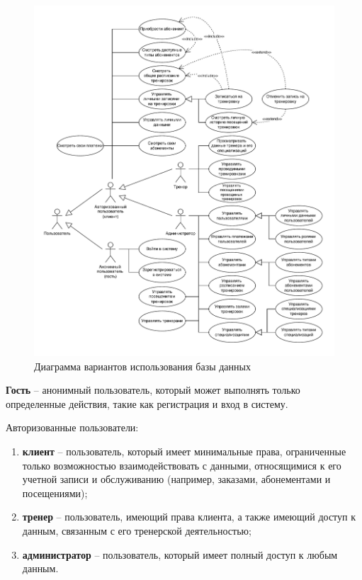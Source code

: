 \begin{figure}[ht!]
	\begin{center}
		\includegraphics[scale=0.70]{./diag/use-case.pdf}
	\end{center}
	\caption{Диаграмма вариантов использования базы данных}
	\label{fig:use-case}
\end{figure}

\textbf{Гость} -- анонимный пользователь, который может выполнять только определенные действия, такие как регистрация и вход в систему.

Авторизованные пользователи: 
\begin{enumerate}[label=---]
	\item \textbf{клиент} -- пользователь, который имеет минимальные права, ограниченные только возможностью взаимодействовать с данными, относящимися к его учетной записи и обслуживанию (например, заказами, абонементами и посещениями);
	
	\item \textbf{тренер} -- пользователь, имеющий права клиента, а также имеющий доступ к данным, связанным с его тренерской деятельностью;
	
	\item \textbf{администратор} -- пользователь, который имеет полный доступ к любым данным.
\end{enumerate}

